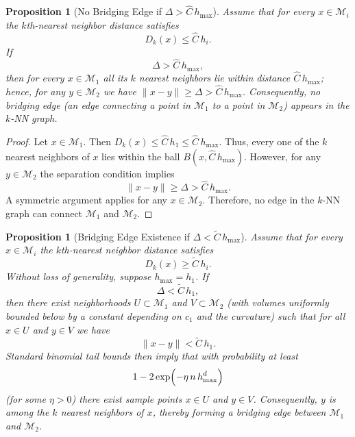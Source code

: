 \documentclass{article}
\theoremstyle{plain}
\newtheorem{proposition}[theorem]{Proposition}
\theoremstyle{definition}
\theoremstyle{remark}
\begin{document}
\begin{proposition}[No Bridging Edge if \(\Delta > \widehat{C}\,h_{\max}\)]\label{prop:no-bridging}
Assume that for every \(x\in \mathcal{M}_i\) the \(k\)th-nearest neighbor distance satisfies
\[
D_k(x) \le \widehat{C}\,h_i.
\]
If 
\[
\Delta > \widehat{C}\,h_{\max},
\]
then for every \(x\in \mathcal{M}_1\) all its \(k\) nearest neighbors lie within distance \(\widehat{C}\,h_{\max}\); hence, for any \(y\in \mathcal{M}_2\) we have \(\|x-y\| \ge \Delta > \widehat{C}\,h_{\max}\). Consequently, no bridging edge (an edge connecting a point in \(\mathcal{M}_1\) to a point in \(\mathcal{M}_2\)) appears in the \(k\)-NN graph.
\end{proposition}

\begin{proof}
Let \(x\in \mathcal{M}_1\). Then \(D_k(x) \le \widehat{C}\,h_1 \le \widehat{C}\,h_{\max}\). Thus, every one of the \(k\) nearest neighbors of \(x\) lies within the ball \(B(x,\widehat{C}\,h_{\max})\). However, for any \(y\in \mathcal{M}_2\) the separation condition implies
\[
\|x-y\| \ge \Delta > \widehat{C}\,h_{\max}.
\]
A symmetric argument applies for any \(x\in \mathcal{M}_2\). Therefore, no edge in the \(k\)-NN graph can connect \(\mathcal{M}_1\) and \(\mathcal{M}_2\).
\end{proof}

\begin{proposition}[Bridging Edge Existence if \(\Delta < \widetilde{C}\,h_{\max}\)]\label{prop:bridging}
Assume that for every \(x\in \mathcal{M}_i\) the \(k\)th-nearest neighbor distance satisfies
\[
D_k(x) \ge \widetilde{C}\,h_i.
\]
Without loss of generality, suppose \(h_{\max} = h_1\). If 
\[
\Delta < \widetilde{C}\,h_1,
\]
then there exist neighborhoods \(U \subset \mathcal{M}_1\) and \(V \subset \mathcal{M}_2\) (with volumes uniformly bounded below by a constant depending on \(c_1\) and the curvature) such that for all \(x\in U\) and \(y\in V\) we have
\[
\|x-y\| < \widetilde{C}\,h_1.
\]
Standard binomial tail bounds then imply that with probability at least 
\[
1-2\exp\Bigl(-\eta\,n\,h_{\max}^d\Bigr)
\]
(for some \(\eta>0\)) there exist sample points \(x\in U\) and \(y\in V\). Consequently, \(y\) is among the \(k\) nearest neighbors of \(x\), thereby forming a bridging edge between \(\mathcal{M}_1\) and \(\mathcal{M}_2\).
\end{proposition}
\end{document}
